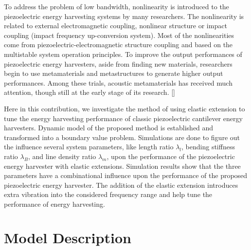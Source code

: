 \documentclass{elsarticle}
\begin{document}
To address the problem of low bandwidth, nonlinearity is introduced to the piezoelectric energy harvesting systems by many researchers. The nonlinearity is related to external electromagnetic coupling, nonlinear structure or impact coupling (impact frequency up-conversion system). Most of the nonlinearities come from piezoelectric-electromagnetic structure coupling and based on the  multistable system operation principles. To improve the output performances of piezoelectric energy harvesters, aside from finding new materials, researchers begin to use metamaterials and metastructures to generate higher output performances. Among these trials, acoustic metamaterials has received much attention, though still at the early stage of its research. []


Here in this contribution, we investigate the method of using elastic extension to tune the energy harvesting performance of classic piezoelectric cantilever energy harvesters. Dynamic model of the proposed method is established and transformed into a boundary value problem. Simulations are done to figure out the influence several system parameters, like length ratio $\lambda_l$, bending stiffness ratio $\lambda_B$, and line density ratio $\lambda_m$, upon the performance of the piezoelectric energy harvester with elastic extensions. Simulation results show that the three parameters have a combinational influence upon the performance of the proposed piezoelectric energy harvester. The addition of the elastic extension introduces extra vibration into the considered frequency range and help tune the performance of energy harvesting. 


\section{Model Description}
\end{document}
